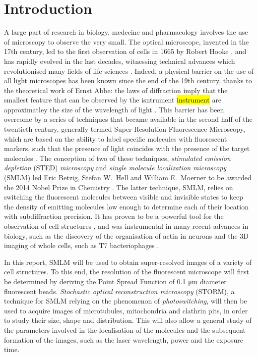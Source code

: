 \section{Introduction}
A large part of research in biology, medecine and pharmacology involves the use of microscopy to observe the very small.
The optical microscope, invented in the 17th century, led to the first observation of cells in 1665 by Robert Hooke \cite{reigoto_comparative_2021}, and has rapidly evolved in the last decades, witnessing technical advances which revolutionised many fields of life sciences \cite{balasubramanian_imagining_2023}.
Indeed, a physical barrier on the use of all light microscopes has been known since the end of the 19th century, thanks to the theoretical work of Ernst Abbe: the laws of diffraction imply that the smallest feature that can be observed by the isntrument \hl{instrument} are approximatley the size of the wavelength of light \cite{diaspro_fundamentals_2011}.
This barrier has been overcome by a series of techniques that became available in the second half of the twentieth century, generally termed Super-Resolution Fluorescence Microscopy, which are based on the ability to label specific molecules with fluorescent markers, such that the presence of light coincides with the presence of the target molecules \cite{douglass_notice_2023}.
The conception of two of these techniques, \emph{stimulated emission depletion} (STED) \emph{microscopy} and \emph{single molecule localization microscopy} (SMLM) led Eric Betzig, Stefan W.~Hell and William E.~Moerner to be awarded the 2014 Nobel Prize in Chemistry \cite{nobel_press_2014}.
The latter technique, SMLM, relies on switching the fluorescent molecules between visible and invisible states to keep the density of emitting molecules low enough to determine each of their location with subdiffraction precision.
It has proven to be a powerful tool for the observation of cell structures \cite{baddeley_biological_2018}, 
and was instrumental in many recent advances in biology, such as the discovery of the organisation of actin in neurons \cite{xu_actin_2013} and the 3D imaging of whole cells, such as T7 bacteriophages \cite{huang_ultra-high_2016}.

In this report, SMLM will be used to obtain super-resolved images of a variety of cell structures.
To this end, the resolution of the fluorescent microscope will first be determined by deriving the Point Spread Function of 0.1 \unit{\micro m} diameter fluorescent beads.
\emph{Stochastic optical reconstruction microscopy} (STORM), a technique for SMLM relying on the phenomenon of \emph{photoswitching}, will then be used to acquire images of microtubules, mitochondria and clathrin pits, in order to study their size, shape and distribution.
This will also allow a general study of the parameters involved in the localisation of the molecules and the subsequent formation of the images, such as the laser wavelength, power and the exposure time.